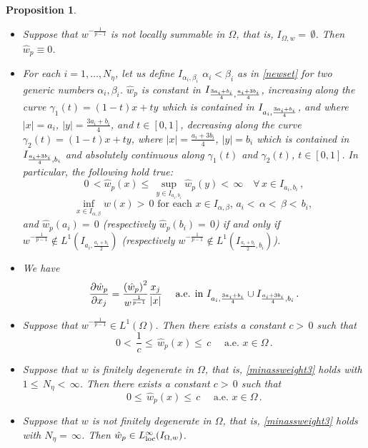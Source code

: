 \documentclass[11pt,leqno]{amsart}
\newtheorem{prop}[teo]{Proposition}
\theoremstyle{remark}
\theoremstyle{definition}
\theoremstyle{definition}
\newcommand{\wstar}{{\hat w}}
\begin{document}
\begin{prop}\label{propw}
\begin{itemize}\
\item[(i)] Suppose that $w^{-\frac{1}{p-1}}$ is  not locally summable in $\Omega$, that is, $I_{\Omega,w}=\,\emptyset$. Then $\wstar_{p}\equiv 0$.
\item[(ii)] For each $i=1,\dots, N_\eta$, let us define $I_{\alpha_{i},\beta_{i}}$ $\alpha_{i}<\beta_{i}$ as in \eqref{newset} for two generic numbers $\alpha_{i},\beta_{i}$. $\wstar_{p}$ is constant in $I_{{{3a_i+b_i}\over{4}},{{a_i+3b_i}\over{4}}}$, increasing along the curve 
$\gamma_{1}(t)=(1-t)x+ty$ which is contained in $I_{{a_i},{{3a_i+b_i}\over{4}}}$, and  where $\vert x\vert=a_{i}$, $\vert y\vert=\frac{3a_i+b_i}{4}$, and $t\in [0,1]$, decreasing along the curve $\gamma_{2}(t)=(1-t)x+ty$, where $\vert x \vert=\frac{a_i+3b_i}{4}$, $\vert y\vert=b_{i}$ which is contained in $I_{{{a_i+3b_i}\over{4}},b_i}$ and absolutely continuous along $\gamma_{1}(t)$ and $\gamma_{2}(t)$, $t\in [0,1]$.  In particular, the following hold true:
\[
0\,<\wstar_{p}(x)\le\,\sup_{y\in I_{a_i,b_i}}\wstar_{p}(y)<\,\infty\quad\forall\,  x \in I_{a_i,b_i}\,,
\]
\[
\inf_{x\in I_{\alpha,\beta}}w(x)>\,0\text{ for each $x\in I_{\alpha,\beta}$, $a_i<\,\alpha<\,\beta<\,b_i$, }
\]
and $\wstar_{p}(a_i)=\,0$ (respectively $\wstar_{p}(b_i)=\,0$) if and only if $w^{-\frac{1}{p-1}}\notin L^1\left(I_{a_i,\frac{a_i+b_i}{2}}\right)$ (respectively $w^{-\frac{1}{p-1}}\notin L^1\left(I_{\frac{a_i+b_i}{2},b_i}\right)$). 
\item[(iii)] We have
\begin{equation*}\label{derwstar}
\frac{\partial \wstar_{p}}{\partial x_{j}}
={{\left(\wstar_{p}\right)^2}\over{w^{\frac{1}{p-1}}}}\frac{x_{j}}{\vert x\vert}\quad\text{ a.e. in }I_{{a_i},{{3a_i+b_i}\over{4}}}\cup I_{{{a_i+3b_i}\over{4}},b_i}\,.
\end{equation*}
\item[(iv)] Suppose that $w^{-\frac{1}{p-1}}\in L^1(\Omega)$. Then there exists a  constant $c>\,0$ such that
\[
0<\,\frac{1}{c}\le\,\wstar_{p}(x)\le\,c\quad\text{ a.e. } x\in\Omega\,.
\]
\item[(v)] Suppose that $w$ is finitely degenerate in $\Omega$, that is, \eqref{minassweight3} holds with $1\le\,N_\eta<\,\infty$. Then there exists a  constant $c>\,0$ such that
\[
0\le\,\wstar_{p}(x)\le\,c\quad\text{ a.e. }x\in\Omega\,.
\]
\item[(vi)] Suppose that $w$ is not finitely degenerate in $\Omega$, that is, \eqref{minassweight3} holds with $N_\eta=\,\infty$. Then $\wstar_{p}\in L^\infty_{\rm loc}(I_{\Omega,w})$.
\end{itemize}
\end{prop}
\end{document}
